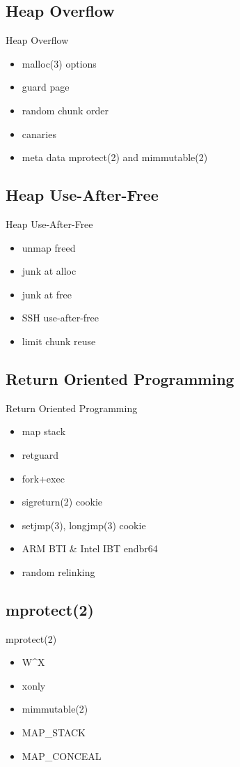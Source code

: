 \documentclass[14pt,aspectratio=169]{beamer}
\begin{document}
\subsection{Heap Overflow}
\begin{frame}{Heap Overflow}
\begin{itemize}
  \item malloc(3) options
  \item guard page
  \item random chunk order
  \item canaries
  \item meta data mprotect(2) and mimmutable(2)
\end{itemize}
\end{frame}

\subsection{Heap Use-After-Free}
\begin{frame}{Heap Use-After-Free}
\begin{itemize}
  \item unmap freed
  \item junk at alloc
  \item junk at free
  \item SSH use-after-free
  \item limit chunk reuse
\end{itemize}
\end{frame}

\subsection{Return Oriented Programming}
\begin{frame}{Return Oriented Programming}
\begin{itemize}
  \item map stack
  \item retguard
  \item fork+exec
  \item sigreturn(2) cookie
  \item setjmp(3), longjmp(3) cookie
  \item ARM BTI \& Intel IBT endbr64
  \item random relinking
\end{itemize}
\end{frame}

\subsection{mprotect(2)}
\begin{frame}{mprotect(2)}
\begin{itemize}
  \item W\^{}X
  \item xonly
  \item mimmutable(2)
  \item MAP\_STACK
  \item MAP\_CONCEAL
\end{itemize}
\end{frame}
\end{document}
